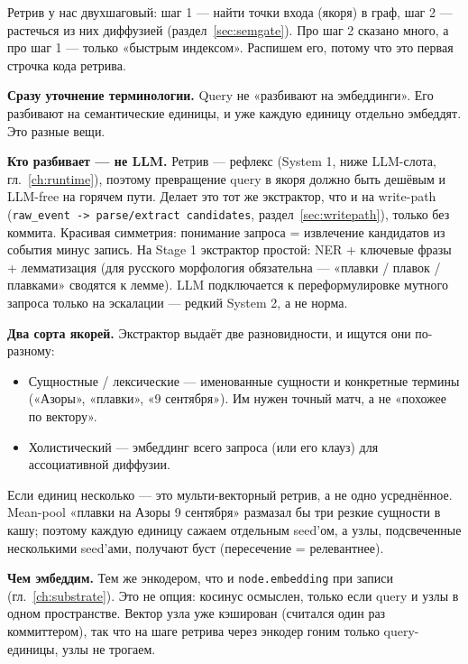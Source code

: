 Ретрив у нас двухшаговый: шаг 1 --- найти точки входа (якоря) в граф, шаг 2 ---
растечься из них диффузией (раздел~\ref{sec:semgate}). Про шаг 2 сказано много,
а про шаг 1 --- только «быстрым индексом». Распишем его, потому что это первая
строчка кода ретрива.

\smallskip\noindent\textbf{Сразу уточнение терминологии.}
Query не «разбивают на эмбеддинги». Его разбивают на семантические единицы,
и уже каждую единицу отдельно эмбеддят. Это разные вещи.

\smallskip\noindent\textbf{Кто разбивает --- не LLM.}
Ретрив --- рефлекс (System 1, ниже LLM-слота, гл.~\ref{ch:runtime}), поэтому
превращение query в якоря должно быть дешёвым и LLM-free на горячем пути.
Делает это тот же экстрактор, что и на write-path
(\texttt{raw\_event -> parse/extract candidates}, раздел~\ref{sec:writepath}),
только без коммита. Красивая симметрия: понимание запроса = извлечение
кандидатов из события минус запись. На Stage 1 экстрактор простой: NER +
ключевые фразы + лемматизация (для русского морфология обязательна ---
«плавки / плавок / плавками» сводятся к лемме). LLM подключается к
переформулировке мутного запроса только на эскалации --- редкий System 2, а не
норма.

\smallskip\noindent\textbf{Два сорта якорей.}
Экстрактор выдаёт две разновидности, и ищутся они по-разному:
\begin{itemize}
\item Сущностные / лексические --- именованные сущности и конкретные термины
(«Азоры», «плавки», «9 сентября»). Им нужен точный матч, а не «похожее по
вектору».
\item Холистический --- эмбеддинг всего запроса (или его клауз) для
ассоциативной диффузии.
\end{itemize}

Если единиц несколько --- это мульти-векторный ретрив, а не одно усреднённое.
Mean-pool «плавки на Азоры 9 сентября» размазал бы три резкие сущности в кашу;
поэтому каждую единицу сажаем отдельным seed'ом, а узлы, подсвеченные
несколькими seed'ами, получают буст (пересечение = релевантнее).

\smallskip\noindent\textbf{Чем эмбеддим.}
Тем же энкодером, что и \texttt{node.embedding} при записи (гл.~\ref{ch:substrate}).
Это не опция: косинус осмыслен, только если query и узлы в одном пространстве.
Вектор узла уже кэширован (считался один раз коммиттером), так что на шаге
ретрива через энкодер гоним только query-единицы, узлы не трогаем.

